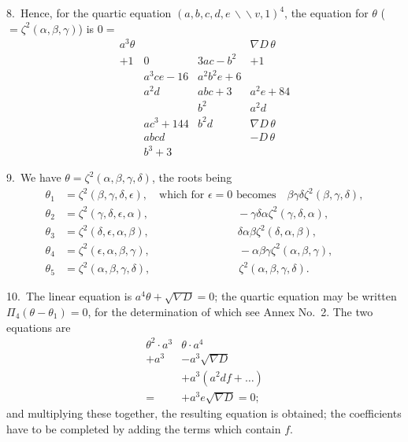 \documentclass[11pt,a4paper]{book}
\begin{document}
8.\ Hence, for the quartic equation $(a,b,c,d,e\,\backslash\!\!\backslash v,1)^4$, the equation for $\theta$ ($=\zeta^2(\alpha,\beta,\gamma)$) is $0=$
\[
\begin{array}{cccc}
a^3\theta & & & \nabla D\,\theta\\
+1 & 0 & 3ac-b^2 & +1\\
& a^3ce-16 & a^2b^2e+6 & \\[-4pt]
& a^2d & abc+3 & a^2e+84\\[-4pt]
& & b^2 & a^2d\\[-4pt]
& ac^3+144 & b^2d & \nabla D\,\theta\\
& abcd & & -D\,\theta\\
& b^3+3 & &
\end{array}
\]

\newpage
\setcounter{page}{303}

9.\ We have $\theta=\zeta^2(\alpha,\beta,\gamma,\delta)$, the roots being
\begin{align*}
\theta_1 &= \zeta^2(\beta,\gamma,\delta,\epsilon),\quad \text{which for }\epsilon=0\text{ becomes}\quad \beta\gamma\delta\zeta^2(\beta,\gamma,\delta),\\
\theta_2 &= \zeta^2(\gamma,\delta,\epsilon,\alpha),\qquad\qquad\qquad\qquad -\gamma\delta\alpha\zeta^2(\gamma,\delta,\alpha),\\
\theta_3 &= \zeta^2(\delta,\epsilon,\alpha,\beta),\qquad\qquad\qquad\qquad \delta\alpha\beta\zeta^2(\delta,\alpha,\beta),\\
\theta_4 &= \zeta^2(\epsilon,\alpha,\beta,\gamma),\qquad\qquad\qquad\qquad -\alpha\beta\gamma\zeta^2(\alpha,\beta,\gamma),\\
\theta_5 &= \zeta^2(\alpha,\beta,\gamma,\delta),\qquad\qquad\qquad\qquad \zeta^2(\alpha,\beta,\gamma,\delta).
\end{align*}

10.\ The linear equation is $a^4\theta + \sqrt{\nabla D}=0$; the quartic equation may be written $\Pi_4(\theta - \theta_1)=0$, for the determination of which see Annex No.~2. The two equations are
\[
\begin{array}{cc}
\theta^2\cdot a^3 & \theta\cdot a^4 \\
+ a^3 & -a^3\sqrt{\nabla D} \\
& + a^3(a^2df + \dots) \\
= & +a^3e\sqrt{\nabla D} = 0;
\end{array}
\]
and multiplying these together, the resulting equation is obtained; the coefficients have to be completed by adding the terms which contain $f$.
\end{document}
